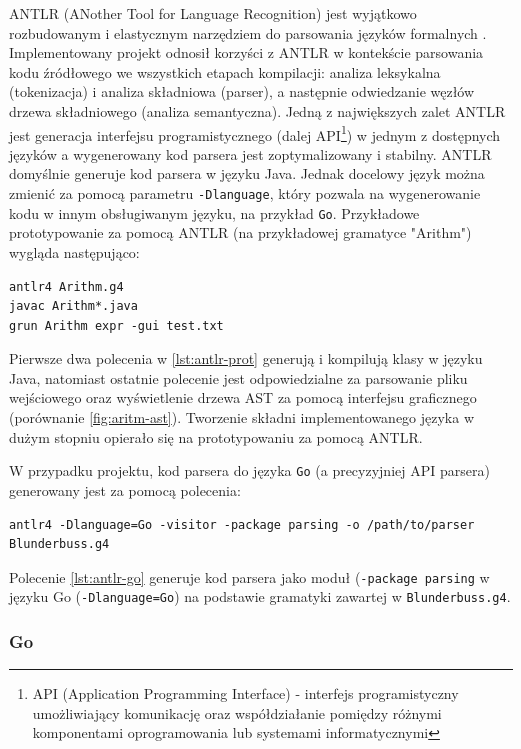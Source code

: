 ANTLR (ANother Tool for Language Recognition) jest wyjątkowo rozbudowanym i elastycznym narzędziem do parsowania języków formalnych \cite{bib:antlr}. Implementowany projekt odnosił korzyści z ANTLR w kontekście parsowania kodu źródłowego we wszystkich etapach kompilacji: analiza leksykalna (tokenizacja) i analiza składniowa (parser), a następnie odwiedzanie węzłów drzewa składniowego (analiza semantyczna). Jedną z największych zalet ANTLR jest generacja interfejsu programistycznego (dalej API\footnote{API (Application Programming Interface) - interfejs programistyczny umożliwiający komunikację oraz współdziałanie pomiędzy różnymi komponentami oprogramowania lub systemami informatycznymi}) w jednym z dostępnych języków a wygenerowany kod parsera jest zoptymalizowany i stabilny. ANTLR domyślnie generuje kod parsera w języku Java. Jednak docelowy język można zmienić za pomocą parametru \verb|-Dlanguage|, który pozwala na wygenerowanie kodu w innym obsługiwanym języku, na przykład \verb|Go|. Przykładowe prototypowanie za pomocą ANTLR (na przykładowej gramatyce "Arithm") wygląda następująco:

\begin{lstlisting}[caption={Prototypowanie za pomocą ANTLR}, label={lst:antlr-prot}]
antlr4 Arithm.g4
javac Arithm*.java
grun Arithm expr -gui test.txt
\end{lstlisting}

Pierwsze dwa polecenia w \ref{lst:antlr-prot} generują i kompilują klasy w języku Java, natomiast ostatnie polecenie jest odpowiedzialne za parsowanie pliku wejściowego oraz wyświetlenie drzewa AST za pomocą interfejsu graficznego (porównanie \ref{fig:aritm-ast}). Tworzenie składni implementowanego języka w dużym stopniu opierało się na prototypowaniu za pomocą ANTLR.

W przypadku projektu, kod parsera do języka \verb|Go| (a precyzyjniej API parsera) generowany jest za pomocą polecenia:

\begin{lstlisting}[caption={Generowanie API parsera w docelowym języku programowania Go}, label={lst:antlr-go}]
antlr4 -Dlanguage=Go -visitor -package parsing -o /path/to/parser Blunderbuss.g4
\end{lstlisting}

Polecenie \ref{lst:antlr-go} generuje kod parsera jako moduł (\verb|-package parsing| w języku Go (\verb|-Dlanguage=Go|) na podstawie gramatyki zawartej w \verb|Blunderbuss.g4|.

\subsubsection{Go}

